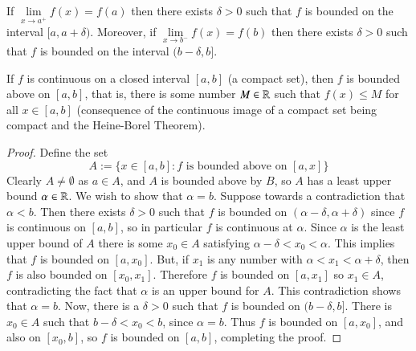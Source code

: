 \documentclass[12pt, a4paper, oneside, openright, titlepage]{book}
\begin{document}
\begin{cor}
    If $\lim\limits_{x\rightarrow a^+}f(x) = f(a)$ then there exists $\delta > 0$ such that $f$ is bounded on the interval $[a,a+\delta)$. Moreover, if $\lim\limits_{x\rightarrow b^-}f(x) = f(b)$ then there exists $\delta > 0$ such that $f$ is bounded on the interval $(b-\delta, b]$.
\end{cor}


\begin{thm}
    If $f$ is continuous on a closed interval $[a,b]$ (a compact set), then $f$ is bounded above on $[a,b]$, that is, there is some number $M \in \mathbb R$ such that $f(x) \leq M$ for all $x \in [a,b]$ (consequence of the continuous image of a compact set being compact and the Heine-Borel Theorem).
\end{thm}
\begin{proof}
    Define the set $$A:= \{x\in [a,b]:\text{$f$ is bounded above on $[a,x]$}\}$$
    Clearly $A \neq \emptyset$ as $a \in A$, and $A$ is bounded above by $B$, so $A$ has a least upper bound $\alpha \in \mathbb R$. We wish to show that $\alpha = b$. Suppose towards a contradiction that $\alpha < b$. Then there exists $\delta > 0$ such that $f$ is bounded on $(\alpha-\delta, \alpha + \delta)$ since $f$ is continuous on $[a,b]$, so in particular $f$ is continuous at $\alpha$. Since $\alpha$ is the least upper bound of $A$ there is some $x_0 \in A$ satisfying $\alpha - \delta < x_0 < \alpha$. This implies that $f$ is bounded on $[a,x_0]$. But, if $x_1$ is any number with $\alpha < x_1 < \alpha + \delta$, then $f$ is also bounded on $[x_0,x_1]$. Therefore $f$ is bounded on $[a,x_1]$ so $x_1 \in A$, contradicting the fact that $\alpha$ is an upper bound for $A$. This contradiction shows that $\alpha = b$. Now, there is a $\delta > 0$ such that $f$ is bounded on $(b-\delta, b]$. There is $x_0 \in A$ such that $b - \delta < x_0 < b$, since $\alpha = b$. Thus $f$ is bounded on $[a,x_0]$, and also on $[x_0,b]$, so $f$ is bounded on $[a,b]$, completing the proof.
\end{proof}
\end{document}
